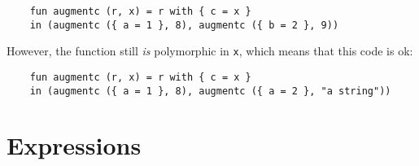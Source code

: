 \documentclass{article}
\begin{document}
\begin{verbatim}
    fun augmentc (r, x) = r with { c = x }
    in (augmentc ({ a = 1 }, 8), augmentc ({ b = 2 }, 9))

\end{verbatim}

However, the function still {\em is} polymorphic in {\tt x}, which
means that this code is ok:

\begin{verbatim}
    fun augmentc (r, x) = r with { c = x }
    in (augmentc ({ a = 1 }, 8), augmentc ({ a = 2 }, "a string"))

\end{verbatim}

\section{Expressions}
\end{document}
